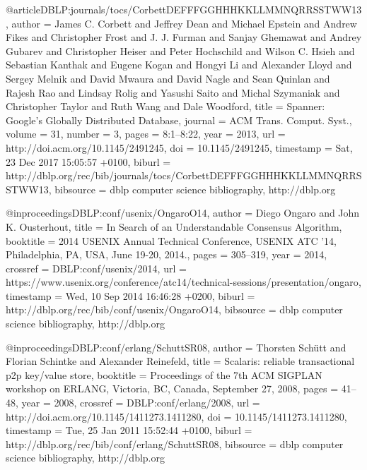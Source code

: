 @article{DBLP:journals/tocs/CorbettDEFFFGGHHHKKLLMMNQRRSSTWW13,
  author    = {James C. Corbett and
               Jeffrey Dean and
               Michael Epstein and
               Andrew Fikes and
               Christopher Frost and
               J. J. Furman and
               Sanjay Ghemawat and
               Andrey Gubarev and
               Christopher Heiser and
               Peter Hochschild and
               Wilson C. Hsieh and
               Sebastian Kanthak and
               Eugene Kogan and
               Hongyi Li and
               Alexander Lloyd and
               Sergey Melnik and
               David Mwaura and
               David Nagle and
               Sean Quinlan and
               Rajesh Rao and
               Lindsay Rolig and
               Yasushi Saito and
               Michal Szymaniak and
               Christopher Taylor and
               Ruth Wang and
               Dale Woodford},
  title     = {Spanner: Google's Globally Distributed Database},
  journal   = {{ACM} Trans. Comput. Syst.},
  volume    = {31},
  number    = {3},
  pages     = {8:1--8:22},
  year      = {2013},
  url       = {http://doi.acm.org/10.1145/2491245},
  doi       = {10.1145/2491245},
  timestamp = {Sat, 23 Dec 2017 15:05:57 +0100},
  biburl    = {http://dblp.org/rec/bib/journals/tocs/CorbettDEFFFGGHHHKKLLMMNQRRSSTWW13},
  bibsource = {dblp computer science bibliography, http://dblp.org}
}

@inproceedings{DBLP:conf/usenix/OngaroO14,
  author    = {Diego Ongaro and
               John K. Ousterhout},
  title     = {In Search of an Understandable Consensus Algorithm},
  booktitle = {2014 {USENIX} Annual Technical Conference, {USENIX} {ATC} '14, Philadelphia,
               PA, USA, June 19-20, 2014.},
  pages     = {305--319},
  year      = {2014},
  crossref  = {DBLP:conf/usenix/2014},
  url       = {https://www.usenix.org/conference/atc14/technical-sessions/presentation/ongaro},
  timestamp = {Wed, 10 Sep 2014 16:46:28 +0200},
  biburl    = {http://dblp.org/rec/bib/conf/usenix/OngaroO14},
  bibsource = {dblp computer science bibliography, http://dblp.org}
}

@inproceedings{DBLP:conf/erlang/SchuttSR08,
  author    = {Thorsten Sch{\"{u}}tt and
               Florian Schintke and
               Alexander Reinefeld},
  title     = {Scalaris: reliable transactional p2p key/value store},
  booktitle = {Proceedings of the 7th {ACM} {SIGPLAN} workshop on ERLANG, Victoria,
               BC, Canada, September 27, 2008},
  pages     = {41--48},
  year      = {2008},
  crossref  = {DBLP:conf/erlang/2008},
  url       = {http://doi.acm.org/10.1145/1411273.1411280},
  doi       = {10.1145/1411273.1411280},
  timestamp = {Tue, 25 Jan 2011 15:52:44 +0100},
  biburl    = {http://dblp.org/rec/bib/conf/erlang/SchuttSR08},
  bibsource = {dblp computer science bibliography, http://dblp.org}
}

